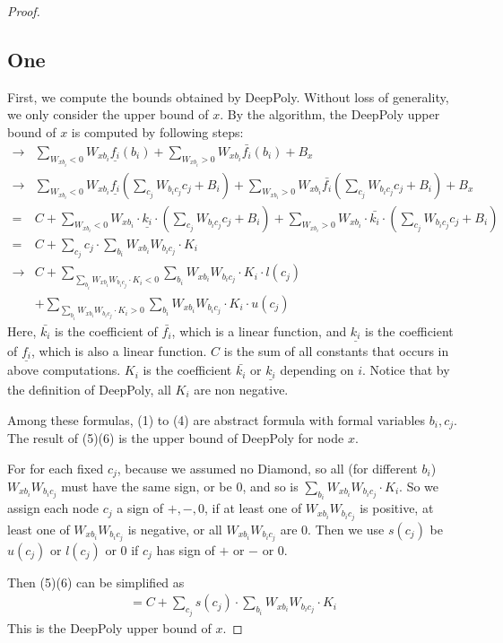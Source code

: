 \documentclass[]{article}
\theoremstyle{definition}
\begin{document}
\begin{proof}
\subsection*{One} First, we compute the bounds obtained by DeepPoly. Without loss of generality, we only consider the upper bound of $x$.   By the algorithm, the DeepPoly upper bound of $x$ is computed by following steps: \begin{align}
 \rightarrow&\sum_{W_{xb_i}<0}W_{xb_i}\underline{f_i}(b_i)+\sum_{W_{xb_i}>0}W_{xb_i}\bar{f_i}(b_i)+B_x\\
 \rightarrow&\sum_{W_{xb_i}<0}W_{xb_i}\underline{f_i}(\sum_{c_j}W_{b_ic_j}c_j+B_i)+\sum_{W_{xb_i}>0}W_{xb_i}\bar{f_i}(\sum_{c_j}W_{b_ic_j}c_j+B_i)+B_x\\
 =& C+\sum_{W_{xb_i}<0}W_{xb_i}\cdot\underline{k_i}\cdot(\sum_{c_j}W_{b_ic_j}c_j+B_i)+\sum_{W_{xb_i}>0}W_{xb_i}\cdot\bar{k_i}\cdot(\sum_{c_j}W_{b_ic_j}c_j+B_i)\\
 =& C+\sum_{c_j}c_j\cdot\sum_{b_i}W_{xb_i}W_{b_ic_j}\cdot K_i\\
 \rightarrow& C+\sum_{\sum_{b_i}W_{xb_i}W_{b_ic_j}\cdot K_i<0}\sum_{b_i}W_{xb_i}W_{b_ic_j}\cdot K_i\cdot l(c_j)\\
 &+\sum_{\sum_{b_i}W_{xb_i}W_{b_ic_j}\cdot K_i>0}\sum_{b_i}W_{xb_i}W_{b_ic_j}\cdot K_i\cdot u(c_j)
\end{align} Here, $\bar{k_i}$ is the coefficient of $\bar{f_i}$, which is a linear function, and $\underline{k_i}$ is the coefficient of $\underline{f_i}$, which is also a linear function. $C$ is the sum of all constants that occurs in above computations. $K_i$ is the coefficient $\bar{k_i}$ or $\underline{k_i}$ depending on $i$. Notice that by the definition of DeepPoly, all $K_i$ are non negative. 

Among these formulas, (1) to (4) are abstract formula with formal variables $b_i,c_j$. The result of (5)(6) is the upper bound of DeepPoly for node $x$. 

For for each fixed $c_j$, because we assumed no Diamond, so all (for different $b_i$) $W_{xb_i}W_{b_ic_j}$ must have the same sign, or be $0$, and so is $\sum_{b_i}W_{xb_i}W_{b_ic_j}\cdot K_i$. So we assign each node $c_j$ a sign of $+,-,0$,  if at least one of $W_{xb_i}W_{b_ic_j}$ is positive, at least one of $W_{xb_i}W_{b_ic_j}$ is negative, or all $W_{xb_i}W_{b_ic_j}$ are 0. Then we use $s(c_j)$ be $u(c_j)$ or $l(c_j)$ or $0$ if $c_j$ has sign of $+$ or $-$ or $0$.



Then (5)(6) can be simplified as \begin{align}
	=C+\sum_{c_j}s(c_j)\cdot\sum_{b_i}W_{xb_i}W_{b_ic_j}\cdot K_i
\end{align} This is the DeepPoly upper bound of $x$.


\end{proof}
\end{document}
